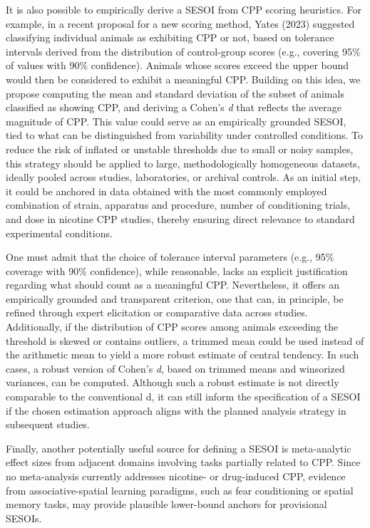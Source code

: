 \documentclass[authordate, meta, issue]{jote-new-article}
\begin{document}
	It is also possible to empirically derive a SESOI from CPP scoring heuristics. For example, in a recent proposal for a new scoring method, Yates (2023) suggested classifying individual animals as exhibiting CPP or not, based on tolerance intervals derived from the distribution of control-group scores (e.g., covering 95\% of values with 90\% confidence). Animals whose scores exceed the upper bound would then be considered to exhibit a meaningful CPP. Building on this idea, we propose computing the mean and standard deviation of the subset of animals classified as showing CPP, and deriving a Cohen's \emph{d} that reflects the average magnitude of CPP. This value could serve as an empirically grounded SESOI, tied to what can be distinguished from variability under controlled conditions. To reduce the risk of inflated or unstable thresholds due to small or noisy samples, this strategy should be applied to large, methodologically homogeneous datasets, ideally pooled across studies, laboratories, or archival controls. As an initial step, it could be anchored in data obtained with the most commonly employed combination of strain, apparatus and procedure, number of conditioning trials, and dose in nicotine CPP studies, thereby ensuring direct relevance to standard experimental conditions.



	One must admit that the choice of tolerance interval parameters (e.g., 95\% coverage with 90\% confidence), while reasonable, lacks an explicit justification regarding what should count as a meaningful CPP. Nevertheless, it offers an empirically grounded and transparent criterion, one that can, in principle, be refined through expert elicitation or comparative data across studies. Additionally, if the distribution of CPP scores among animals exceeding the threshold is skewed or contains outliers, a trimmed mean could be used instead of the arithmetic mean to yield a more robust estimate of central tendency. In such cases, a robust version of Cohen's \emph{d}, based on trimmed means and winsorized variances, can be computed. Although such a robust estimate is not directly comparable to the conventional d, it can still inform the specification of a SESOI if the chosen estimation approach aligns with the planned analysis strategy in subsequent studies.



	Finally, another potentially useful source for defining a SESOI is meta-analytic effect sizes from adjacent domains involving tasks partially related to CPP. Since no meta-analysis currently addresses nicotine- or drug-induced CPP, evidence from associative-spatial learning paradigms, such as fear conditioning or spatial memory tasks, may provide plausible lower-bound anchors for provisional SESOIs.
\end{document}
